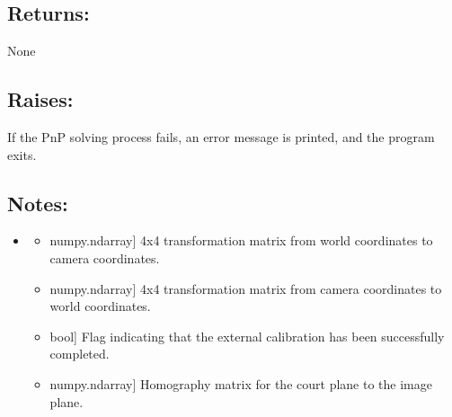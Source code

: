 \documentclass[letterpaper,10pt,english]{sphinxmanual}
\begin{document}
\begin{fulllineitems}
\begin{fulllineitems}
\subsection{Returns:}
\label{\detokenize{CameraUtils:returns}}
\sphinxAtStartPar
None


\subsection{Raises:}
\label{\detokenize{CameraUtils:raises}}\begin{description}
\sphinxAtStartPar
If the PnP solving process fails, an error message is printed, and the program exits.

\end{description}


\subsection{Notes:}
\label{\detokenize{CameraUtils:notes}}\begin{itemize}
\item {} \begin{description}
\begin{itemize}
\item {} \begin{description}
\sphinxlineitem{\sphinxtitleref{self.W2C\_mtx}}{[}numpy.ndarray{]}
\sphinxAtStartPar
4x4 transformation matrix from world coordinates to camera coordinates.

\end{description}

\item {} \begin{description}
\sphinxlineitem{\sphinxtitleref{self.C2W\_mtx}}{[}numpy.ndarray{]}
\sphinxAtStartPar
4x4 transformation matrix from camera coordinates to world coordinates.

\end{description}

\item {} \begin{description}
\sphinxlineitem{\sphinxtitleref{self.EXT\_CAL}}{[}bool{]}
\sphinxAtStartPar
Flag indicating that the external calibration has been successfully completed.

\end{description}

\item {} \begin{description}
\sphinxlineitem{\sphinxtitleref{self.H\_mtx}}{[}numpy.ndarray{]}
\sphinxAtStartPar
Homography matrix for the court plane to the image plane.


\end{description}
\end{itemize}
\end{description}
\end{itemize}
\end{fulllineitems}
\end{fulllineitems}
\end{document}
